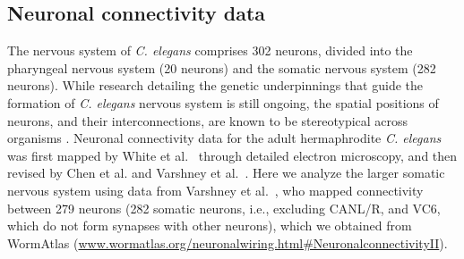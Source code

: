 \documentclass[10pt,letterpaper]{article}
\begin{document}
\subsection*{Neuronal connectivity data}
The nervous system of \emph{C. elegans} comprises 302 neurons, divided into the pharyngeal nervous system (20 neurons) and the somatic nervous system (282 neurons).
\color{teal}
While research detailing the genetic underpinnings that guide the formation of \textit{C. elegans} nervous system is still ongoing, the spatial positions of neurons, and their interconnections, are known to be stereotypical across organisms \cite{Riddle1997}.
\color{black}
Neuronal connectivity data for the adult hermaphrodite \emph{C. elegans} was first mapped by White et al.~\cite{White:1986tx} through detailed electron microscopy, and then revised by Chen et al. \cite{Chen:2006ie} and Varshney et al.~\cite{Varshney2011}.
Here we analyze the larger somatic nervous system using data from Varshney et al.~\cite{Varshney2011}, who mapped connectivity between 279 neurons (282 somatic neurons, i.e., excluding CANL/R, and VC6, which do not form synapses with other neurons), which we obtained from WormAtlas \cite{WormAtlas} (\url{www.wormatlas.org/neuronalwiring.html#NeuronalconnectivityII}).
\end{document}
